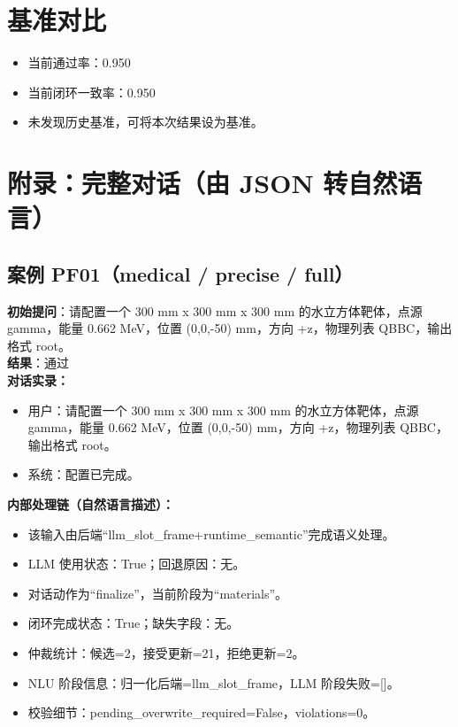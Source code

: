 \documentclass[11pt]{ctexart}
\begin{document}
\section{基准对比}
\begin{itemize}
\item 当前通过率：0.950
\item 当前闭环一致率：0.950
\item 未发现历史基准，可将本次结果设为基准。
\end{itemize}
\appendix
\section{附录：完整对话（由 JSON 转自然语言）}
\subsection{案例 PF01（medical / precise / full）}
\textbf{初始提问}：请配置一个 300 mm x 300 mm x 300 mm 的水立方体靶体，点源 gamma，能量 0.662 MeV，位置 (0,0,-50) mm，方向 +z，物理列表 QBBC，输出格式 root。\\
\textbf{结果}：通过\\
\textbf{对话实录：}
\begin{itemize}
\item 用户：请配置一个 300 mm x 300 mm x 300 mm 的水立方体靶体，点源 gamma，能量 0.662 MeV，位置 (0,0,-50) mm，方向 +z，物理列表 QBBC，输出格式 root。
\item 系统：配置已完成。
\end{itemize}
\textbf{内部处理链（自然语言描述）：}
\begin{itemize}
\item 该输入由后端“llm\_slot\_frame+runtime\_semantic”完成语义处理。
\item LLM 使用状态：True；回退原因：无。
\item 对话动作为“finalize”，当前阶段为“materials”。
\item 闭环完成状态：True；缺失字段：无。
\item 仲裁统计：候选=2，接受更新=21，拒绝更新=2。
\item NLU 阶段信息：归一化后端=llm\_slot\_frame，LLM 阶段失败=[]。
\item 校验细节：pending\_overwrite\_required=False，violations=0。
\end{itemize}
\end{document}
